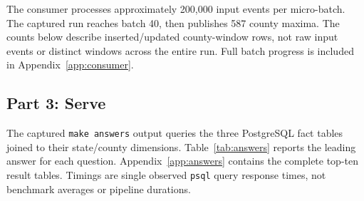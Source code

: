 \documentclass[11pt,letterpaper]{article}
\newcommand{\reportdir}{.}
\newcommand{\reportdir}{documentation}
\newcommand{\captureroot}{\reportdir/evidence/run-59ewk1}
\begin{document}
\noindent\begin{minipage}{\linewidth}

\end{minipage}

\noindent\begin{minipage}{\linewidth}

\end{minipage}

The consumer processes approximately 200,000 input events per micro-batch.
The captured run reaches batch 40, then publishes 587 county maxima.
The counts below describe inserted/updated county-window rows, not raw input
events or distinct windows across the entire run. Full batch progress is
included in Appendix~\ref{app:consumer}.

\noindent\begin{minipage}{\linewidth}

\end{minipage}

\noindent\begin{minipage}{\linewidth}

\end{minipage}

\subsection{Part 3: Serve}\label{sec:serve}
The captured \texttt{make answers} output queries the three PostgreSQL fact
tables joined to their state/county dimensions. Table~\ref{tab:answers}
reports the leading answer for each question. Appendix~\ref{app:answers}
contains the complete top-ten result tables. Timings are single observed
\texttt{psql} query response times, not benchmark averages or pipeline durations.
\end{document}
